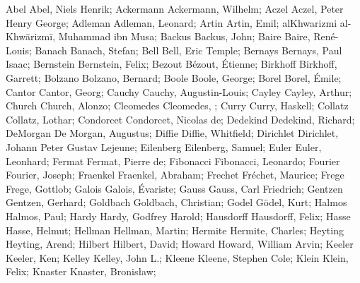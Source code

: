 \DefFriend Abel             Abel, Niels Henrik;
\DefFriend Ackermann        Ackermann, Wilhelm;
\DefFriend Aczel            Aczel, Peter Henry George;
\DefFriend Adleman          Adleman, Leonard;
\DefFriend Artin            Artin, Emil;
\DefFriend alKhwarizmi      al-Khwārizmī, Muhammad ibn Musa;
\DefFriend Backus           Backus, John;
\DefFriend Baire            Baire, René-Louis;
\DefFriend Banach           Banach, Stefan;
\DefFriend Bell             Bell, Eric Temple;
\DefFriend Bernays          Bernays, Paul Isaac;
\DefFriend Bernstein        Bernstein, Felix;
\DefFriend Bezout           Bézout, Étienne;
\DefFriend Birkhoff         Birkhoff, Garrett;
\DefFriend Bolzano          Bolzano, Bernard;
\DefFriend Boole            Boole, George;
\DefFriend Borel            Borel, Émile;
\DefFriend Cantor           Cantor, Georg;
\DefFriend Cauchy           Cauchy, Augustin-Louis;
\DefFriend Cayley           Cayley, Arthur;
\DefFriend Church           Church, Alonzo;
\DefFriend Cleomedes        Cleomedes, ; %
\DefFriend Curry            Curry, Haskell;
\DefFriend Collatz          Collatz, Lothar;
\DefFriend Condorcet        Condorcet, Nicolas de;
\DefFriend Dedekind         Dedekind, Richard;
\DefFriend DeMorgan         De Morgan, Augustus;
\DefFriend Diffie           Diffie, Whitfield;
\DefFriend Dirichlet        Dirichlet, Johann Peter Gustav Lejeune;
\DefFriend Eilenberg        Eilenberg, Samuel;
\DefFriend Euler            Euler, Leonhard;
\DefFriend Fermat           Fermat, Pierre de;
\DefFriend Fibonacci        Fibonacci, Leonardo;
\DefFriend Fourier          Fourier, Joseph;
\DefFriend Fraenkel         Fraenkel, Abraham;
\DefFriend Frechet          Fréchet, Maurice;
\DefFriend Frege            Frege, Gottlob;
\DefFriend Galois           Galois, Évariste;
\DefFriend Gauss            Gauss, Carl Friedrich;
\DefFriend Gentzen          Gentzen, Gerhard;
\DefFriend Goldbach         Goldbach, Christian;
\DefFriend Godel            Gödel, Kurt;
\DefFriend Halmos           Halmos, Paul;
\DefFriend Hardy            Hardy, Godfrey Harold;
\DefFriend Hausdorff        Hausdorff, Felix;
\DefFriend Hasse            Hasse, Helmut;
\DefFriend Hellman          Hellman, Martin;
\DefFriend Hermite          Hermite, Charles;
\DefFriend Heyting          Heyting, Arend;
\DefFriend Hilbert          Hilbert, David;
\DefFriend Howard           Howard, William Arvin;
\DefFriend Keeler           Keeler, Ken;
\DefFriend Kelley           Kelley, John L.;
\DefFriend Kleene           Kleene, Stephen Cole;
\DefFriend Klein            Klein, Felix;
\DefFriend Knaster          Knaster, Bronisław;
